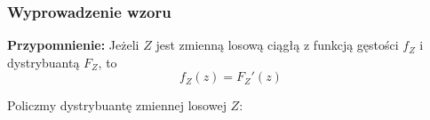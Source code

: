 \documentclass{article}
\begin{document}
    \subsubsection{Wyprowadzenie wzoru}










    \textbf{Przypomnienie:} Jeżeli $Z$ jest zmienną losową ciągłą z funkcją gęstości $f_Z$ i dystrybuantą $F_Z$, to 
    \[ f_Z(z) = F_Z'(z) \]

    Policzmy dystrybuantę zmiennej losowej $Z$:

    \begin{equation}
    \end{equation}
\end{document}
